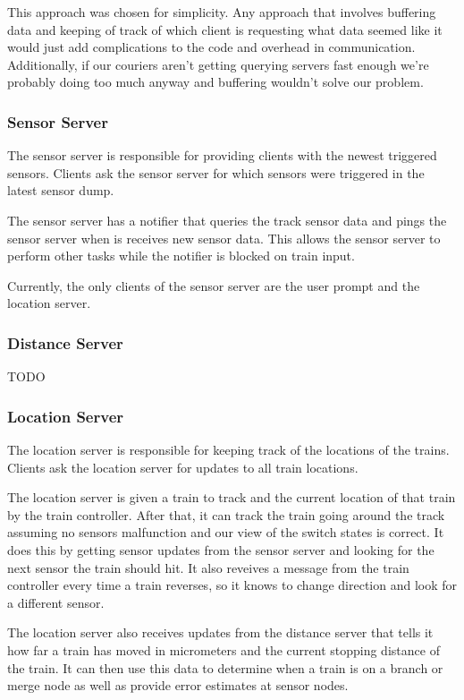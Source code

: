 \documentclass[letterpaper]{article}
\begin{document}
This approach was chosen for simplicity. Any approach that involves buffering data and keeping of track of which client is requesting what data seemed like it would just add complications to the code and overhead in communication. Additionally, if our couriers aren't getting querying servers fast enough we're probably doing too much anyway and buffering wouldn't solve our problem.

\subsubsection{Sensor Server}

The sensor server is responsible for providing clients with the newest triggered sensors. Clients ask the sensor server for which sensors were triggered in the latest sensor dump.

The sensor server has a notifier that queries the track sensor data and pings the sensor server when is receives new sensor data. This allows the sensor server to perform other tasks while the notifier is blocked on train input.

Currently, the only clients of the sensor server are the user prompt and the location server.

\subsubsection{Distance Server}

TODO

\subsubsection{Location Server}

The location server is responsible for keeping track of the locations of the trains. Clients ask the location server for updates to all train locations.

The location server is given a train to track and the current location of that train by the train controller. After that, it can track the train going around the track assuming no sensors malfunction and our view of the switch states is correct. It does this by getting sensor updates from the sensor server and looking for the next sensor the train should hit. It also reveives a message from the train controller every time a train reverses, so it knows to change direction and look for a different sensor.

The location server also receives updates from the distance server that tells it how far a train has moved in micrometers and the current stopping distance of the train. It can then use this data to determine when a train is on a branch or merge node as well as provide error estimates at sensor nodes.
\end{document}
